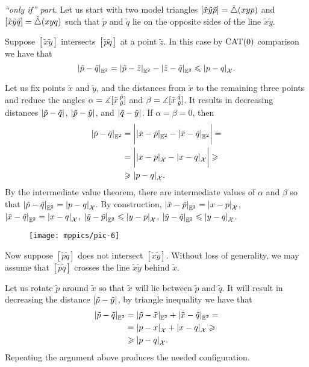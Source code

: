 \parbf{\ref{ex:sba-2+2-short};} \textit{``only if'' part.}
Let us start with two model triangles $[\tilde x\tilde y\tilde p]=\tilde\triangle(xyp)$ and $[\tilde x\tilde y\tilde q]=\tilde\triangle(xyq)$ such that $\tilde p$ and $\tilde q$ lie on the opposite sides of the line $\tilde x\tilde y$.

Suppose $[\tilde x \tilde y]$ intersects $[\tilde p\tilde q]$ at a point $\tilde z$.
In this case by $\mathrm{CAT}(0)$ comparison we have that
\[\dist{\tilde p}{\tilde q}{\EE^2}=\dist{\tilde p}{\tilde z}{\EE^2}-\dist{\tilde z}{\tilde q}{\EE^2}\le \dist{p}{q}{\spc{X}}.\]

Let us fix points $\tilde x$ and $\tilde y$, and the distances from $\tilde x$ to the remaining three points and reduce the angles $\alpha=\measuredangle[\tilde x\,{}^{\tilde p}_{\tilde y}]$ and $\beta=\measuredangle[\tilde x\,{}^{\tilde q}_{\tilde y}]$.
It results in decreasing distances $\dist{\tilde p}{\tilde q}{}$, $\dist{\tilde p}{\tilde y}{}$, and $\dist{\tilde q}{\tilde y}{}$.
If $\alpha=\beta=0$, then 
\begin{align*}
\dist{\tilde p}{\tilde q}{\EE^2}&=
\biggl|\dist{\tilde x}{\tilde p}{\EE^2}-\dist{\tilde x}{\tilde q}{\EE^2}\biggr|=
\\
&=\biggl|\dist{ x}{ p}{\spc{X}}-\dist{ x}{ q}{\spc{X}}\biggr|\ge
\\
&\ge\dist{p}{q}{\spc{X}}.
\end{align*}
By the intermediate value theorem, there are intermediate values of $\alpha$ and $\beta$ so that $\dist{\tilde p}{\tilde q}{\EE^2}\z=\dist{p}{q}{\spc{X}}$.
By construction, $\dist{\tilde x}{\tilde p}{\EE^2}=\dist{x}{p}{\spc{X}}$, $\dist{\tilde x}{\tilde q}{\EE^2}=\dist{x}{q}{\spc{X}}$, $\dist{\tilde y}{\tilde p}{\EE^2}\le\dist{y}{p}{\spc{X}}$, $\dist{\tilde y}{\tilde q}{\EE^2}\le\dist{y}{q}{\spc{X}}$.

\begin{wrapfigure}{o}{30 mm}
\vskip-0mm
\centering
\texttt{[image: mppics/pic-6]}
\end{wrapfigure}

Now suppose $[\tilde p \tilde q]$ does not intersect $[\tilde x\tilde y]$.
Without loss of generality, we may assume that $[\tilde p \tilde q]$ crosses the line $\tilde x\tilde y$ behind $\tilde x$.

Let us rotate $\tilde p$ around $\tilde x$ so that $\tilde x$ will lie between $\tilde p$ and $\tilde q$.
It will result in decreasing the distance $\dist{\tilde p}{\tilde y}{}$,
by triangle inequality we have that 
\begin{align*}
\dist{\tilde p}{\tilde q}{\EE^2}&=\dist{\tilde p}{\tilde x}{\EE^2}+\dist{\tilde x}{\tilde q}{\EE^2}=
\\
&=\dist{p}{x}{\spc{X}}+\dist{x}{q}{\spc{X}}\ge
\\
&\ge \dist{p}{q}{\spc{X}}.
\end{align*}
Repeating the argument above produces the needed configuration.

